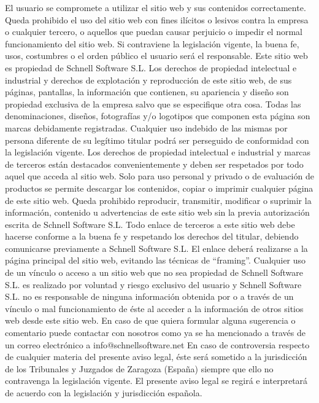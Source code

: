 \documentclass[10pt,a4paper]{article}
\begin{document}
\begin{enumerate}
El usuario se compromete a utilizar el sitio web y sus contenidos correctamente. Queda prohibido el uso del sitio web con fines ilícitos o lesivos contra la empresa o cualquier tercero, o aquellos que puedan causar perjuicio o impedir el normal funcionamiento del sitio web. Si contraviene la legislación vigente, la buena fe, usos, costumbres o el orden público el usuario será el responsable.
Este sitio web es propiedad de Schnell Software S.L. Los derechos de propiedad intelectual e industrial y derechos de explotación y reproducción de este sitio web, de sus páginas, pantallas, la información que contienen, su apariencia y diseño son propiedad exclusiva de la empresa salvo que se especifique otra cosa. Todas las denominaciones, diseños, fotografías y/o logotipos que componen esta página son marcas debidamente registradas. Cualquier uso indebido de las mismas por persona diferente de su legítimo titular podrá ser perseguido de conformidad con la legislación vigente. Los derechos de propiedad intelectual e industrial y marcas de terceros están destacados convenientemente y deben ser respetados por todo aquel que acceda al sitio web. Solo para uso personal y privado o de evaluación de productos se permite descargar los contenidos, copiar o imprimir cualquier página de este sitio web. Queda prohibido reproducir, transmitir, modificar o suprimir la información, contenido u advertencias de este sitio web sin la previa autorización escrita de Schnell Software S.L.
Todo enlace de terceros a este sitio web debe hacerse conforme a la buena fe y respetando los derechos del titular, debiendo comunicarse previamente a Schnell Software S.L. El enlace deberá realizarse a la página principal del sitio web, evitando las técnicas de “framing”.
Cualquier uso de un vínculo o acceso a un sitio web que no sea propiedad de Schnell Software S.L. es realizado por voluntad y riesgo exclusivo del usuario y Schnell Software S.L. no es responsable de ninguna información obtenida por o a través de un vínculo o mal funcionamiento de éste al acceder a la información de otros sitios web desde este sitio web.
En caso de que quiera formular alguna sugerencia o comentario puede contactar con nosotros como ya se ha mencionado a través de un correo electrónico a info@schnellsoftware.net
En caso de controversia respecto de cualquier materia del presente aviso legal, éste será sometido a la jurisdicción de los Tribunales y Juzgados de Zaragoza (España) siempre que ello no contravenga la legislación vigente. El presente aviso legal se regirá e interpretará de acuerdo con la legislación y jurisdicción española.


\end{enumerate}
\end{document}
